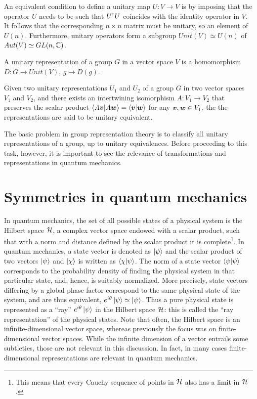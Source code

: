 An equivalent condition to define a unitary map $U : V \to V$ is by imposing that the operator $U$ needs to be such that $U^\dagger U$ coincides with the identity operator in $V$. It follows that the corresponding $n \times n$ matrix must be unitary, so an element of $U(n)$. Furthermore, unitary operators form a subgroup $Unit(V) \simeq U(n)$ of $Aut(V) \simeq GL(n,\mathbb{C})$. 
\begin{defn}
    A unitary representation of a group $G$ in a vector space $V$ is a homomorphism $D : G \to Unit(V)$, $g\mapsto D(g)$.
\end{defn}
\begin{defn}
    Given two unitary representations $U_1$ and $U_2$ of a group $G$ in two vector spaces $V_1$ and $V_2$, and there exists an intertwining isomorphism $A : V_1 \to V_2$ that preserves the scalar product $\langle A\bm{v} | A\bm{w} \rangle = \langle \bm{v} | \bm{w} \rangle$ for any $\bm{v},\bm{w} \in V_1$, the the representations are said to be unitary equivalent.
\end{defn}
The basic problem in group representation theory is to classify all unitary representations of a group, up to unitary equivalences. Before proceeding to this task, however, it is important to see the relevance of transformations and representations in quantum mechanics.

\section{Symmetries in quantum mechanics}
In quantum mechanics, the set of all possible states of a physical system is the Hilbert space $\mathcal{H}$, a complex vector space endowed with a scalar product, such that with a norm and distance defined by the scalar product it is complete\footnote{This means that every Cauchy sequence of points in $\mathcal{H}$ also has a limit in $\mathcal{H}$.}. In quantum mechanics, a state vector is denoted as $\ket{\psi}$ and the scalar product of two vectors $\ket{\psi}$ and $\ket{\chi}$ is written as $\langle \chi | \psi \rangle$. The norm of a state vector $\langle \psi | \psi \rangle$ corresponds to the probability density of finding the physical system in that particular state, and, hence, is suitably normalized. More precisely, state vectors differing by a global phase factor correspond to the same physical state of the system, and are thus equivalent, $e^{i\theta}\ket{\psi} \simeq \ket{\psi}$. Thus a pure physical state is represented as a ``ray'' $e^{i\theta}\ket{\psi}$ in the Hilbert space $\mathcal{H}$: this is called the ``ray representation'' of the physical states. Note that often, the Hilbert space is an infinite-dimensional vector space, whereas previously the focus was on finite-dimensional vector spaces. While the infinite dimension of a vector entrails some subtleties, those are not relevant in this discussion. In fact, in many cases finite-dimensional representations are relevant in quantum mechanics. 

